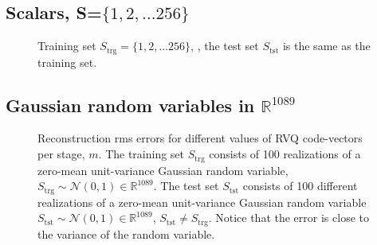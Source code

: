 \subsection{Scalars, S=$\{1, 2, \ldots 256\}$}
								\begin{figure}[h]
								\centering
								\subtable{\begin{tiny}\end{tiny}}
								\caption{Training set  $S_{\textrm{trg}}=\{1, 2, \ldots 256\}$, , the test set $S_{\textrm{tst}}$ is the same as the training set.}
								\label{fig:aRVQ_1_to_256}
								\end{figure}

\clearpage
\newpage
\subsection{Gaussian random variables in $\mathbb{R}^{1089}$}

								\begin{figure}[h]
								\centering
								\subtable{\begin{tiny}\end{tiny}}
								\caption{Reconstruction rms errors for different values of RVQ code-vectors per stage, $m$.  The training set $S_{\textrm{trg}}$ consists of 100 realizations of a zero-mean unit-variance Gaussian random variable, $S_{\textrm{trg}} \sim \mathcal{N}(0, 1) \in \mathbb{R}^{1089}$.  The test set $S_{\textrm{tst}}$ consists of 100 different realizations of a zero-mean unit-variance Gaussian random variable 	 $S_{\textrm{tst}} \sim \mathcal{N}(0, 1) \in \mathbb{R}^{1089}$, $S_{\textrm{tst}} \neq S_{\textrm{trg}}$.  Notice that the error is close to the variance of the random variable. }
								\label{fig:aRVQ_gaussian_rand}
								\end{figure}

